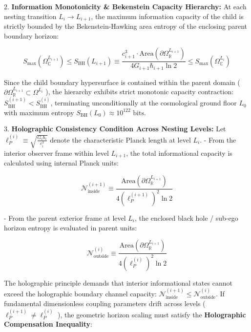 \documentclass[11pt,a4paper]{article}
\theoremstyle{definition}
\theoremstyle{remark}
\begin{document}
2. \textbf{Information Monotonicity \& Bekenstein Capacity Hierarchy:}
At each nesting transition $L_i \to L_{i+1}$, the maximum information capacity of the child is strictly bounded by the Bekenstein-Hawking area entropy of the enclosing parent boundary horizon:


\begin{equation}
\boxed{S_{\text{max}}(\Omega_\mathbb{C}^{L_{i+1}}) \le S_{\text{BH}}(L_{i+1}) \equiv \frac{c_{i+1}^3 \cdot \mathrm{Area}(\partial \Omega_\mathbb{R}^{L_{i+1}})}{4 G_{i+1} \hbar_{i+1} \ln 2} \le S_{\text{max}}(\Omega_\mathbb{C}^{L_i})}
\end{equation}


Since the child boundary hypersurface is contained within the parent domain ( $\partial \Omega_\mathbb{R}^{L_{i+1}} \subset \Omega^{L_i}$ ), the hierarchy exhibits strict monotonic capacity contraction: $S_{\text{BH}}^{(i+1)} < S_{\text{BH}}^{(i)}$, terminating unconditionally at the cosmological ground floor $L_0$ with maximum entropy $S_{\text{BH}}(L_0) \approx 10^{122} \text{ bits}$.

3. \textbf{Holographic Consistency Condition Across Nesting Levels:}
Let $\ell_P^{(i)} \equiv \sqrt{\frac{G_i \hbar_i}{c_i^3}}$ denote the characteristic Planck length at level $L_i$.
- From the interior observer frame within level $L_{i+1}$, the total informational capacity is calculated using internal Planck units:


\begin{equation}
\mathcal{N}_{\text{inside}}^{(i+1)} \equiv \frac{\mathrm{Area}(\partial \Omega_\mathbb{R}^{L_{i+1}})}{4 (\ell_P^{(i+1)})^2 \ln 2}
\end{equation}


- From the parent exterior frame at level $L_i$, the enclosed black hole / sub-ego horizon entropy is evaluated in parent units:


\begin{equation}
\mathcal{N}_{\text{outside}}^{(i)} \equiv \frac{\mathrm{Area}(\partial \Omega_\mathbb{R}^{L_{i+1}})}{4 (\ell_P^{(i)})^2 \ln 2}
\end{equation}


The holographic principle demands that interior informational states cannot exceed the holographic boundary channel capacity: $\mathcal{N}_{\text{inside}}^{(i+1)} \le \mathcal{N}_{\text{outside}}^{(i)}$.
If fundamental dimensionless coupling parameters drift across levels ( $\ell_P^{(i+1)} \neq \ell_P^{(i)}$ ), the geometric horizon scaling must satisfy the \textbf{Holographic Compensation Inequality}:
\end{document}
